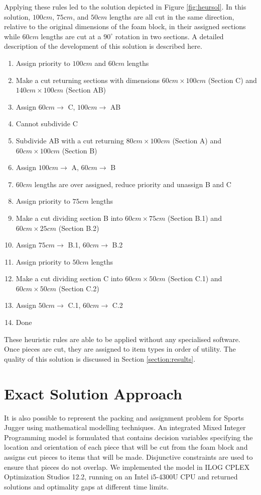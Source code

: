 \documentclass[10pt,a4paper]{article}
\begin{document}
Applying these rules led to the solution depicted in Figure \ref{fig:heursol}. In this solution, $100cm$, $75cm$, and $50cm$ lengths are all cut in the same direction, relative to the original dimensions of the foam block, in their assigned sections while $60cm$ lengths are cut at a $90^{\circ}$ rotation in two sections. A detailed description of the development of this solution is described here.
\begin{enumerate}
\item Assign priority to $100cm$ and $60cm$ lengths
\item Make a cut returning sections with dimensions $60cm \times 100cm$ (Section C) and $140cm \times 100cm$ (Section AB)
\item Assign $60cm\rightarrow$ C, $100cm\rightarrow$ AB
\item Cannot subdivide C
\item Subdivide AB with a cut returning $80cm \times 100cm$ (Section A) and $60cm \times 100cm$ (Section B) 
\item Assign $100cm\rightarrow$ A, $60cm\rightarrow$ B
\item $60cm$ lengths are over assigned, reduce priority and unassign B and C
\item Assign priority to $75cm$ lengths
\item Make a cut dividing section B into $60cm \times 75cm$ (Section B.1) and $60cm \times 25cm$ (Section B.2)
\item Assign $75cm\rightarrow$ B.1, $60cm\rightarrow$ B.2
\item Assign priority to $50cm$ lengths
\item Make a cut dividing section C into $60cm \times 50cm$ (Section C.1) and $60cm \times 50cm$ (Section C.2)
\item Assign $50cm\rightarrow$ C.1, $60cm\rightarrow$ C.2
\item Done
\end{enumerate}

These heuristic rules are able to be applied without any specialised software. Once pieces are cut, they are assigned to item types in order of utility. The quality of this solution is discussed in Section \ref{section:results}. 

\section{Exact Solution Approach}
It is also possible to represent the packing and assignment problem for Sports Jugger using mathematical modelling techniques. An integrated Mixed Integer Programming model is formulated that contains decision variables specifying the location and orientation of each piece that will be cut from the foam block and assigns cut pieces to items that will be made. Disjunctive constraints are used to ensure that pieces do not overlap.
We implemented the model in ILOG CPLEX Optimization Studios 12.2, running on an Intel i5-4300U CPU and returned solutions and optimality gaps at different time limits. 
\end{document}
